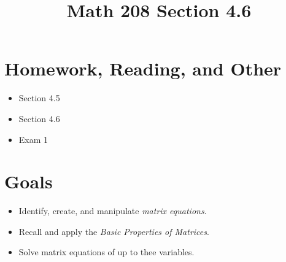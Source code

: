 \documentclass[14pt]{extarticle}
\title{\vspace{-5ex}Math 208 Section 4.6}
\date{\vspace{-10ex}}
\begin{document}
\maketitle		
\section*{Homework, Reading, and Other}
\begin{itemize}
	\item Section 4.5
	\item Section 4.6
	\item Exam 1
\end{itemize}

\section*{Goals}
\begin{itemize}
	\item Identify, create, and manipulate \textit{matrix equations}.
	\item Recall and apply the \textit{Basic Properties of Matrices}.
	\item Solve matrix equations of up to thee variables.
\end{itemize}
\end{document}
